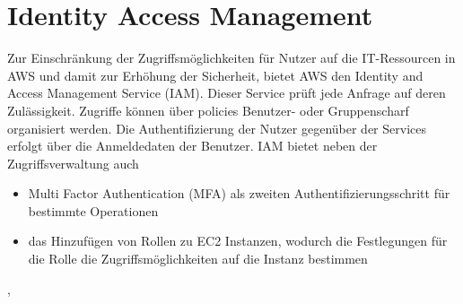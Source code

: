 \section{Identity Access Management}
\label{sec:iam}
Zur Einschränkung der Zugriffsmöglichkeiten für Nutzer auf die IT-Ressourcen in AWS und damit zur Erhöhung der Sicherheit, bietet AWS den Identity and Access Management Service (IAM). Dieser Service prüft jede Anfrage auf deren Zulässigkeit. Zugriffe können über policies Benutzer- oder Gruppenscharf organisiert werden. Die Authentifizierung der Nutzer gegenüber der Services erfolgt über die Anmeldedaten der Benutzer. IAM bietet neben der Zugriffsverwaltung auch
\begin{itemize}
  \item Multi Factor Authentication (MFA) als zweiten Authentifizierungsschritt für bestimmte Operationen
  \item das Hinzufügen von Rollen zu EC2 Instanzen, wodurch die Festlegungen für die Rolle die Zugriffsmöglichkeiten auf die Instanz bestimmen
\end{itemize}
\cite{vliet:resilience}, \cite{wittig:awsinaction}

